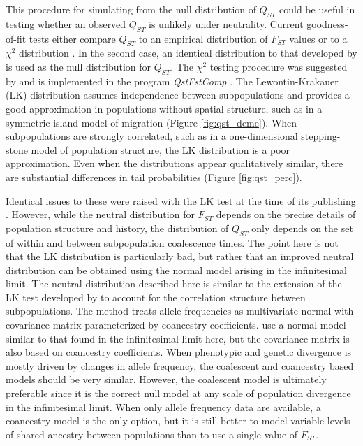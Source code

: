 This procedure for simulating from the null distribution of $Q_{ST}$ could be
useful in testing whether an observed $Q_{ST}$ is unlikely under neutrality.
Current goodness-of-fit tests either compare $Q_{ST}$ to an empirical
distribution of $F_{ST}$ values or to a $\chi^2$ distribution
\citep{Leinonen2013}. In the second case, an identical distribution to that
developed by \citet{Lewontin1973} is used as the null distribution for $Q_{ST}$.
The $\chi^2$ testing procedure was suggested by \citet{Whitlock2009} and is
implemented in the program \textit{QstFstComp} \citep{Gilbert2015}. The
Lewontin-Krakauer (LK) distribution assumes independence between subpopulations
and provides a good approximation in populations without spatial structure, such
as in a symmetric island model of migration (Figure \ref{fig:qst_deme}). When
subpopulations are strongly correlated, such as in a one-dimensional
stepping-stone model of population structure, the LK distribution is a poor
approximation. Even when the distributions appear qualitatively similar, there
are substantial differences in tail probabilities (Figure \ref{fig:qst_perc}).

Identical issues to these were raised with the LK test at the time of its
publishing \citep{Nei1975,Robertson1975}. However, while the neutral
distribution for $F_{ST}$ depends on the precise details of population structure
and history, the distribution of $Q_{ST}$ only depends on the set of within and
between subpopulation coalescence times. The point here is not that the LK
distribution is particularly bad, but rather that an improved neutral
distribution can be obtained using the normal model arising in the infinitesimal
limit. The neutral distribution described here is similar to the extension of
the LK test developed by \citet{Bonhomme2010} to account for the correlation
structure between subpopulations. The \citet{Bonhomme2010} method treats allele
frequencies as multivariate normal with covariance matrix parameterized by
coancestry coefficients. \citet{Ovaskainen2011} use a normal model similar to
that found in the infinitesimal limit here, but the covariance matrix is also
based on coancestry coefficients. When phenotypic and genetic divergence is
mostly driven by changes in allele frequency, the coalescent and coancestry
based models should be very similar. However, the coalescent model is ultimately
preferable since it is the correct null model at any scale of population
divergence in the infinitesimal limit. When only allele frequency data are
available, a coancestry model is the only option, but it is still better to
model variable levels of shared ancestry between populations than to use a
single value of $F_{ST}$.

